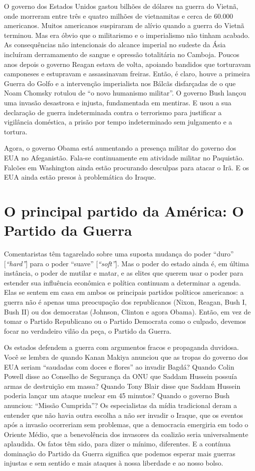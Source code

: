 O governo dos Estados Unidos gastou bilhões de dólares na guerra do Vietnã, onde morreram entre três e quatro milhões de vietnamitas e cerca de 60.000 americanos. Muitos americanos suspiraram de alívio quando a guerra do Vietnã terminou. Mas era óbvio que o militarismo e o imperialismo não tinham acabado. As consequências não intencionais do alcance imperial no sudeste da Ásia incluíram derramamento de sangue e opressão totalitária no Camboja. Poucos anos depois o governo Reagan estava de volta, apoiando bandidos que torturavam camponeses e estupravam e assassinavam freiras. Então, é claro, houve a primeira Guerra do Golfo e a intervenção imperialista nos Bálcãs disfarçadas de o que Noam Chomsky rotulou de ``o novo humanismo militar''. O governo Bush lançou uma invasão desastrosa e injusta, fundamentada em mentiras. E usou a sua declaração de guerra indeterminada contra o terrorismo para justificar a vigilância doméstica, a prisão por tempo indeterminado sem julgamento e a tortura.

Agora, o governo Obama está aumentando a presença militar do governo dos EUA no Afeganistão. Fala-se continuamente em atividade militar no Paquistão. Falcões em Washington ainda estão procurando desculpas para atacar o Irã. E os EUA ainda estão presos à problemática do Iraque.

\section{O principal partido da América: O Partido da Guerra}

Comentaristas têm tagarelado sobre uma suposta mudança do poder ``duro'' [\emph{``hard''}] para o poder ``suave'' [\emph{``soft''}]. Mas o poder do estado ainda é, em última instância, o poder de mutilar e matar, e as elites que querem usar o poder para estender sua influência econômica e política continuam a determinar a agenda. Elas se sentem em casa em ambos os principais partidos políticos americanos: a guerra não é apenas uma preocupação dos republicanos (Nixon, Reagan, Bush I, Bush II) ou dos democratas (Johnson, Clinton e agora Obama). Então, em vez de tomar o Partido Republicano ou o Partido Democrata como o culpado, devemos focar no verdadeiro vilão da peça, o Partido da Guerra.

Os estados defendem a guerra com argumentos fracos e propaganda duvidosa. Você se lembra de quando Kanan Makiya anunciou que as tropas do governo dos EUA seriam ``saudadas com doces e flores'' ao invadir Bagdá? Quando Colin Powell disse ao Conselho de Segurança da ONU que Saddam Hussein possuía armas de destruição em massa? Quando Tony Blair disse que Saddam Hussein poderia lançar um ataque nuclear em 45 minutos? Quando o governo Bush anunciou: ``Missão Cumprida''? Os especialistas da mídia tradicional deram a entender que não havia outra escolha a não ser invadir o Iraque, que os eventos após a invasão ocorreriam sem problemas, que a democracia emergiria em todo o Oriente Médio, que a benevolência dos invasores da coalizão seria universalmente aplaudida. Os fatos têm sido, para dizer o mínimo, diferentes. E a contínua dominação do Partido da Guerra significa que podemos esperar mais guerras injustas e sem sentido e mais ataques à nossa liberdade e ao nosso bolso.


